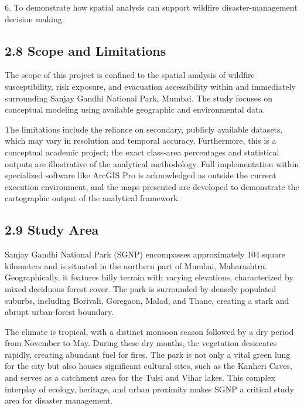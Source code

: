 \documentclass[12pt,a4paper]{article}
\begin{document}
6. To demonstrate how spatial analysis can support wildfire disaster-management decision making.



\subsection*{2.8 Scope and Limitations}

The scope of this project is confined to the spatial analysis of wildfire susceptibility, risk exposure, and evacuation accessibility within and immediately surrounding Sanjay Gandhi National Park, Mumbai. The study focuses on conceptual modeling using available geographic and environmental data.


The limitations include the reliance on secondary, publicly available datasets, which may vary in resolution and temporal accuracy. Furthermore, this is a conceptual academic project; the exact class-area percentages and statistical outputs are illustrative of the analytical methodology. Full implementation within specialized software like ArcGIS Pro is acknowledged as outside the current execution environment, and the maps presented are developed to demonstrate the cartographic output of the analytical framework.



\subsection*{2.9 Study Area}

Sanjay Gandhi National Park (SGNP) encompasses approximately 104 square kilometers and is situated in the northern part of Mumbai, Maharashtra. Geographically, it features hilly terrain with varying elevations, characterized by mixed deciduous forest cover. The park is surrounded by densely populated suburbs, including Borivali, Goregaon, Malad, and Thane, creating a stark and abrupt urban-forest boundary.


The climate is tropical, with a distinct monsoon season followed by a dry period from November to May. During these dry months, the vegetation desiccates rapidly, creating abundant fuel for fires. The park is not only a vital green lung for the city but also houses significant cultural sites, such as the Kanheri Caves, and serves as a catchment area for the Tulsi and Vihar lakes. This complex interplay of ecology, heritage, and urban proximity makes SGNP a critical study area for disaster management.
\end{document}
